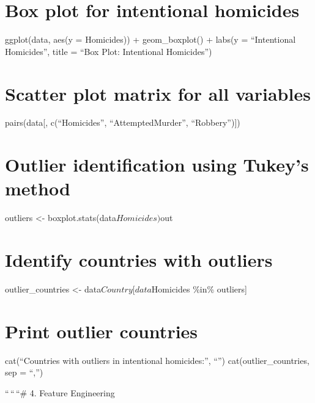 \documentclass[
]{article}
\begin{document}
\hypertarget{box-plot-for-intentional-homicides}{%
\section{Box plot for intentional
homicides}\label{box-plot-for-intentional-homicides}}

ggplot(data, aes(y = Homicides)) + geom\_boxplot() + labs(y =
``Intentional Homicides'', title = ``Box Plot: Intentional Homicides'')

\hypertarget{scatter-plot-matrix-for-all-variables}{%
\section{Scatter plot matrix for all
variables}\label{scatter-plot-matrix-for-all-variables}}

pairs(data{[}, c(``Homicides'', ``AttemptedMurder'', ``Robbery''){]})

\hypertarget{outlier-identification-using-tukeys-method}{%
\section{Outlier identification using Tukey's
method}\label{outlier-identification-using-tukeys-method}}

outliers \textless- boxplot.stats(data\(Homicides)\)out

\hypertarget{identify-countries-with-outliers}{%
\section{Identify countries with
outliers}\label{identify-countries-with-outliers}}

outlier\_countries \textless- data\(Country[data\)Homicides \%in\%
outliers{]}

\hypertarget{print-outlier-countries}{%
\section{Print outlier countries}\label{print-outlier-countries}}

cat(``Countries with outliers in intentional homicides:'', ``\n'')
cat(outlier\_countries, sep = ``,'')

``\,``\,``\# 4. Feature Engineering
\end{document}
